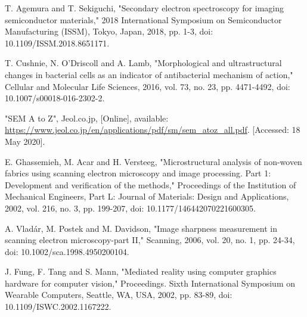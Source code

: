 \documentclass[12pt, conference]{IEEEtran}
\begin{document}
\begin{thebibliography}{00}
    T. Agemura and T. Sekiguchi, "Secondary electron spectroscopy for imaging semiconductor materials," 2018 International Symposium on Semiconductor Manufacturing (ISSM), Tokyo, Japan, 2018, pp. 1-3, doi: 10.1109/ISSM.2018.8651171.

    T. Cushnie, N. O’Driscoll and A. Lamb, "Morphological and ultrastructural changes in bacterial cells as an indicator of antibacterial mechanism of action," Cellular and Molecular Life Sciences, 2016, vol. 73, no. 23, pp. 4471-4492, doi: 10.1007/s00018-016-2302-2.

    "SEM A to Z", Jeol.co.jp, [Online], available: \url{https://www.jeol.co.jp/en/applications/pdf/sm/sem_atoz_all.pdf}. [Accessed: 18 May 2020].

    E. Ghassemieh, M. Acar and H. Versteeg, "Microstructural analysis of non-woven fabrics using scanning electron microscopy and image processing. Part 1: Development and verification of the methods," Proceedings of the Institution of Mechanical Engineers, Part L: Journal of Materials: Design and Applications, 2002, vol. 216, no. 3, pp. 199-207, doi: 10.1177/146442070221600305.

    A. Vladár, M. Postek and M. Davidson, "Image sharpness measurement in scanning electron microscopy-part II," Scanning, 2006, vol. 20, no. 1, pp. 24-34, doi: 10.1002/sca.1998.4950200104.

    J. Fung, F. Tang and S. Mann, "Mediated reality using computer graphics hardware for computer vision," Proceedings. Sixth International Symposium on Wearable Computers, Seattle, WA, USA, 2002, pp. 83-89, doi: 10.1109/ISWC.2002.1167222.





\end{thebibliography}
\end{document}
